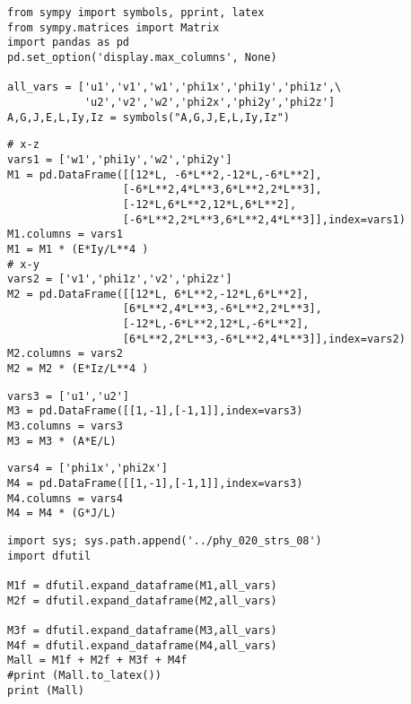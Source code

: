\documentclass[12pt,fleqn]{article}\usepackage{../../common}
\begin{document}

\begin{verbatim}
from sympy import symbols, pprint, latex
from sympy.matrices import Matrix
import pandas as pd
pd.set_option('display.max_columns', None)

all_vars = ['u1','v1','w1','phi1x','phi1y','phi1z',\
            'u2','v2','w2','phi2x','phi2y','phi2z']
A,G,J,E,L,Iy,Iz = symbols("A,G,J,E,L,Iy,Iz")
\end{verbatim}

\begin{verbatim}
# x-z
vars1 = ['w1','phi1y','w2','phi2y']
M1 = pd.DataFrame([[12*L, -6*L**2,-12*L,-6*L**2],
                  [-6*L**2,4*L**3,6*L**2,2*L**3],
                  [-12*L,6*L**2,12*L,6*L**2],
                  [-6*L**2,2*L**3,6*L**2,4*L**3]],index=vars1)
M1.columns = vars1
M1 = M1 * (E*Iy/L**4 )
# x-y
vars2 = ['v1','phi1z','v2','phi2z']
M2 = pd.DataFrame([[12*L, 6*L**2,-12*L,6*L**2],
                  [6*L**2,4*L**3,-6*L**2,2*L**3],
                  [-12*L,-6*L**2,12*L,-6*L**2],
                  [6*L**2,2*L**3,-6*L**2,4*L**3]],index=vars2)
M2.columns = vars2
M2 = M2 * (E*Iz/L**4 )
\end{verbatim}

\begin{verbatim}
vars3 = ['u1','u2']
M3 = pd.DataFrame([[1,-1],[-1,1]],index=vars3)
M3.columns = vars3
M3 = M3 * (A*E/L)
\end{verbatim}

\begin{verbatim}
vars4 = ['phi1x','phi2x']
M4 = pd.DataFrame([[1,-1],[-1,1]],index=vars3)
M4.columns = vars4
M4 = M4 * (G*J/L)
\end{verbatim}

\begin{verbatim}
import sys; sys.path.append('../phy_020_strs_08')
import dfutil

M1f = dfutil.expand_dataframe(M1,all_vars)
M2f = dfutil.expand_dataframe(M2,all_vars)

M3f = dfutil.expand_dataframe(M3,all_vars)
M4f = dfutil.expand_dataframe(M4,all_vars)
Mall = M1f + M2f + M3f + M4f
#print (Mall.to_latex())
print (Mall)
\end{verbatim}
\end{document}
